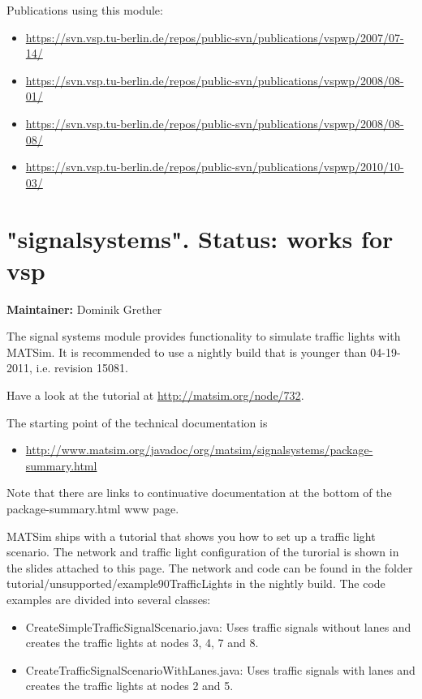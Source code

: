 \documentclass[a4paper,11pt]{report}
\begin{document}
Publications using this module:
\begin{itemize}
	\item \href{https://svn.vsp.tu-berlin.de/repos/public-svn/publications/vspwp/2007/07-14/}{https://svn.vsp.tu-berlin.de/repos/public-svn/publications/vspwp/2007/07-14/}
	\item \href{https://svn.vsp.tu-berlin.de/repos/public-svn/publications/vspwp/2008/08-01/}{https://svn.vsp.tu-berlin.de/repos/public-svn/publications/vspwp/2008/08-01/}
	\item \href{https://svn.vsp.tu-berlin.de/repos/public-svn/publications/vspwp/2008/08-08/}{https://svn.vsp.tu-berlin.de/repos/public-svn/publications/vspwp/2008/08-08/}
	\item \href{https://svn.vsp.tu-berlin.de/repos/public-svn/publications/vspwp/2010/10-03/}{https://svn.vsp.tu-berlin.de/repos/public-svn/publications/vspwp/2010/10-03/}
\end{itemize}



\vfill\eject
\section{"signalsystems". Status: works for vsp}

\textbf{Maintainer:} Dominik Grether

The signal systems module provides functionality to simulate traffic  lights with MATSim. It is recommended to use a nightly build that is  younger than 04-19-2011, i.e. revision 15081.

Have a look at the tutorial at \href{http://matsim.org/node/732}{http://matsim.org/node/732}.

The starting point of the technical documentation is
\begin{itemize}
	\item \href{http://www.matsim.org/javadoc/org/matsim/signalsystems/package-summary.html}{http://www.matsim.org/javadoc/org/matsim/signalsystems/package-summary.html}
\end{itemize}

Note that there are links to continuative documentation at the bottom of the package-summary.html www page.

MATSim ships with a tutorial that shows you how to set up a traffic  light scenario. The network and traffic light configuration of the  turorial is shown in the slides attached to this page. The network and  code can be found in the folder  tutorial/unsupported/example90TrafficLights in the nightly build. The  code examples are divided into several classes:
\begin{itemize}
	\item CreateSimpleTrafficSignalScenario.java: Uses traffic signals  without lanes and creates the traffic lights at nodes 3, 4, 7 and 8.
	\item CreateTrafficSignalScenarioWithLanes.java: Uses traffic signals with lanes and creates the traffic lights at nodes 2 and 5.
\end{itemize}
\end{document}
